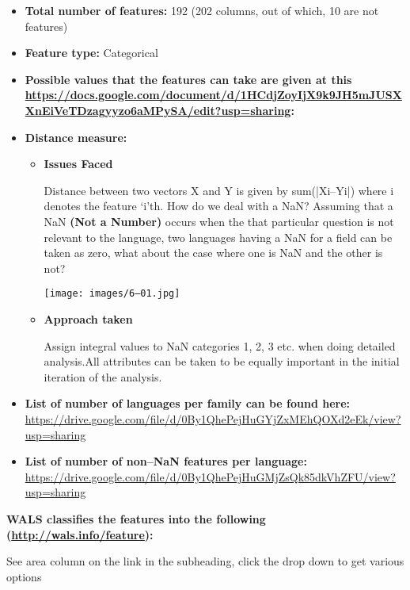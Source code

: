\begin{itemize}
\item \textbf{Total number of features:} 192 (202 columns, out of which, 10 are not features)

 \item \textbf{Feature type:} Categorical

 \item \textbf{Possible values that the features can take are given at this \url{https://docs.google.com/document/d/1HCdjZoyIjX9k9JH5mJUSXXnEiVeTDzagyyzo6aMPySA/edit?usp=sharing}:}

 \newpage


 \item \textbf{Distance measure:}
 
\begin{itemize}
\item 
 \textbf{Issues Faced}

 Distance between two vectors X and Y is given by sum(|Xi–Yi|) where i denotes the feature ‘i’th. How do we deal with a NaN? Assuming that a NaN \textbf{(Not a Number)} occurs when the that particular question is not relevant to the language, two languages having a NaN for a field can be taken as zero, what about the case where one is NaN and the other is not?

 \texttt{[image: images/6–01.jpg]}

 \item 
 \textbf{Approach taken}

 Assign integral values to NaN categories 1, 2, 3 etc. when doing detailed analysis.All attributes can be taken to be equally important in the initial iteration of the analysis.

\end{itemize}

 \item \textbf{List of number of languages per family can be found here:} \url{https://drive.google.com/file/d/0By1QhePejHuGYjZxMEhQOXd2eEk/view?usp=sharing}

 \item \textbf{List of number of non–NaN features per language:} \url{https://drive.google.com/file/d/0By1QhePejHuGMjZsQk85dkVhZFU/view?usp=sharing}

\end{itemize}

\textbf{WALS classifies the features into the following (\url{http://wals.info/feature}):}

See area column on the link in the subheading, click the drop down to get various options

